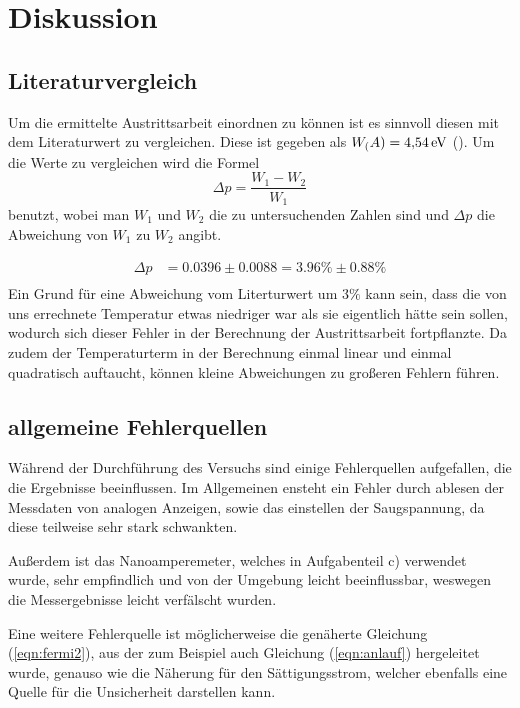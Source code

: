 \section{Diskussion}
\subsection{Literaturvergleich}
Um die ermittelte Austrittsarbeit einordnen zu können ist es sinnvoll diesen mit dem Literaturwert zu vergleichen. Diese ist gegeben als $W_\text(A) = \SI{4,54}{\eV}$ (\cite{formel-sammlung}). Um die Werte 
zu vergleichen wird die Formel 
\begin{equation*}
    \Delta p = \frac{W_1-W_2}{W_1}
\end{equation*}
\noindent
benutzt, wobei man $W_1$ und $W_2$ die zu untersuchenden Zahlen sind und $\Delta p$ die Abweichung von $W_1$ zu $W_2$ angibt.

\begin{align*}
    \Delta p &= 0.0396 \pm 0.0088 = 3.96\% \pm 0.88\% \\
\end{align*}
\noindent
Ein Grund für eine Abweichung vom Literturwert um $ 3 \%$ kann sein, dass die von uns errechnete Temperatur etwas niedriger war als sie eigentlich hätte sein sollen, wodurch sich dieser
Fehler in der Berechnung der Austrittsarbeit fortpflanzte. Da zudem der Temperaturterm in der Berechnung einmal linear und einmal quadratisch auftaucht, können kleine Abweichungen zu großeren
Fehlern führen.


\subsection{allgemeine Fehlerquellen}
Während der Durchführung des Versuchs sind einige Fehlerquellen aufgefallen, die die Ergebnisse beeinflussen.
Im Allgemeinen ensteht ein Fehler durch ablesen der Messdaten von analogen Anzeigen, 
sowie das einstellen der Saugspannung, da diese teilweise sehr stark schwankten.

\noindent
Außerdem ist das Nanoamperemeter, welches in Aufgabenteil c) verwendet wurde, sehr empfindlich und von der Umgebung leicht beeinflussbar,
weswegen die Messergebnisse leicht verfälscht wurden.

\noindent
Eine weitere Fehlerquelle ist möglicherweise die genäherte Gleichung (\ref{eqn:fermi2}), aus der zum Beispiel auch Gleichung (\ref{eqn:anlauf}) hergeleitet wurde, genauso wie die 
Näherung für den Sättigungsstrom, welcher ebenfalls eine Quelle für die Unsicherheit darstellen kann.





